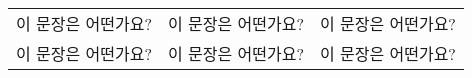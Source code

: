 \documentclass[12pt]{article}
\begin{document}
	
	\begin{tabular}{ | >{\raggedright}p{1.8cm} | 
					   >{\centering}p{1.8cm} | 
					   >{\raggedleft}p{1.8cm} | }
		\hline
		이 문장은 어떤가요? & 이 문장은 어떤가요? & 이 문장은 어떤가요?  
		\tabularnewline
		이 문장은 어떤가요? & 이 문장은 어떤가요? & 이 문장은 어떤가요? 
		\tabularnewline		
		\hline
	\end{tabular}
	
\end{document}
